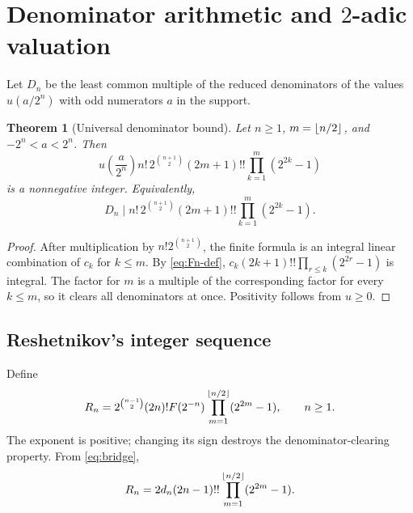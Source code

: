 \documentclass[11pt]{article}
\newtheorem{theorem}{Theorem}[section]
\theoremstyle{definition}
\theoremstyle{remark}
\begin{document}
\section{Denominator arithmetic and $2$-adic valuation}\label{sec:denominators}
Let $D_n$ be the least common multiple of the reduced denominators of the values $u(a/2^n)$ with odd numerators $a$ in the support.

\begin{theorem}[Universal denominator bound]\label{thm:denominator-bound}
Let $n\ge1$, $m=\left\lfloor n/2\right\rfloor$, and $-2^n<a<2^n$.  Then
\begin{equation}\label{eq:denominator-bound}
 u\!\left(\frac a{2^n}\right)n!\,2^{\binom{n+1}{2}}(2m+1)!!
 \prod_{k=1}^{m}(2^{2k}-1)
\end{equation}
is a nonnegative integer.  Equivalently,
\[
 D_n\mid n!\,2^{\binom{n+1}{2}}(2m+1)!!
 \prod_{k=1}^{m}(2^{2k}-1).
\]
\end{theorem}
\begin{proof}
After multiplication by $n!2^{\binom{n+1}{2}}$, the finite formula is an integral linear combination of $c_k$ for $k\le m$.  By \eqref{eq:Fn-def},
$c_k(2k+1)!!\prod_{r\le k}(2^{2r}-1)$ is integral.  The factor for $m$ is a multiple of the corresponding factor for every $k\le m$, so it clears all denominators at once.  Positivity follows from $u\ge0$.
\end{proof}

\subsection{Reshetnikov's integer sequence}
Define
\begin{equation}\label{eq:Rn-def}
 R_n=2^{\binom{n-1}{2}}(2n)!F(2^{-n})
 \prod_{m=1}^{\left\lfloor n/2\right\rfloor}(2^{2m}-1),\qquad n\ge1.
\end{equation}
The exponent is positive; changing its sign destroys the denominator-clearing property.  From \eqref{eq:bridge},
\begin{equation}\label{eq:Rn-dn}
 R_n=2d_n(2n-1)!!\prod_{m=1}^{\left\lfloor n/2\right\rfloor}(2^{2m}-1).
\end{equation}
\end{document}
